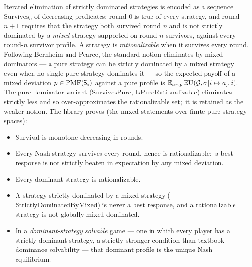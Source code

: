 Iterated elimination of strictly dominated strategies is encoded
as a sequence $\mathrm{Survives}_n$ of decreasing predicates: round
$0$ is true of every strategy, and round $n+1$ requires that the
strategy both survived round $n$ and is not strictly dominated by a
\emph{mixed} strategy supported on round-$n$ survivors, against every
round-$n$ survivor profile.  A strategy is \emph{rationalizable}
when it survives every round.  Following Bernheim and Pearce, the
standard notion eliminates by mixed dominators — a pure strategy can
be strictly dominated by a mixed strategy even when no single pure
strategy dominates it — so the expected payoff of a mixed deviation
$p \in \mathrm{PMF}(\mathsf{S}_i)$ against a pure profile is
$\mathbb{E}_{a \sim p}\,\mathrm{EU}(\mathcal{G}, \sigma[i \mapsto a], i)$.  The
pure-dominator variant ($\mathrm{SurvivesPure}$,
$\mathrm{IsPureRationalizable}$) eliminates strictly less and so
over-approximates the rationalizable set;\ it is retained as the
weaker notion.  The library proves (the mixed statements over finite
pure-strategy spaces):
\begin{itemize}
\item Survival is monotone decreasing in rounds.
\item Every Nash strategy survives every round, hence is
rationalizable:\ a best response is not strictly beaten in
expectation by any mixed deviation.
\item Every dominant strategy is rationalizable.
\item A strategy strictly dominated by a mixed strategy
($\mathrm{StrictlyDominatedByMixed}$) is never a best response, and a
rationalizable strategy is not globally mixed-dominated.
\item In a \emph{dominant-strategy solvable} game — one in which every
player has a strictly dominant strategy, a strictly stronger condition
than textbook dominance solvability — that dominant profile is the unique
Nash equilibrium.
\end{itemize}


